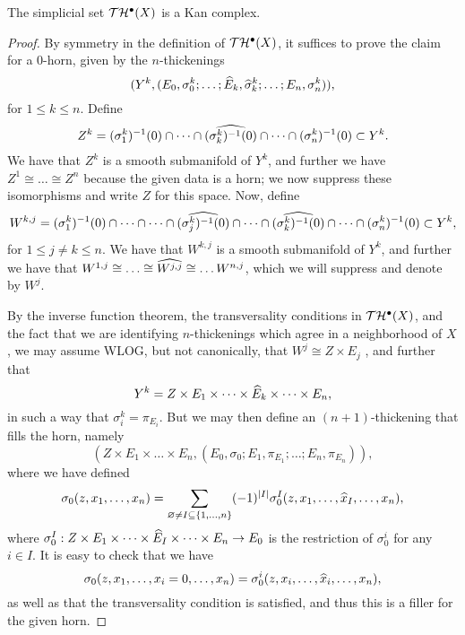 \begin{prop}\label{thickenings-are-kan-complexes}
The simplicial set $\mathcal T \mathcal H^\bullet(X)$ is a Kan complex.
\end{prop}

\begin{proof}
 By symmetry in the definition of $\mathcal T \mathcal H^\bullet(X)$, it suffices to prove the claim for a $0$-horn, given by the $n$-thickenings
\[ (Y^k, (E_0, \sigma_0^k; \dots; \widehat E_k, \widehat \sigma_k^k; \dots; E_n, \sigma_n^k)), \]
for $1 \leq k \leq n$. Define
\[ Z^k = (\sigma_1^k)^{-1}(0) \cap \dots \cap \widehat {(\sigma_k^k)^{-1}(0)} \cap \dots \cap (\sigma_n^k)^{-1}(0) \subset Y^k. \]
We have that $Z^k$ is a smooth submanifold of $Y^k$, and further we have $Z^1 \cong \dots \cong Z^n$ because the given data is a horn; we now suppress these isomorphisms and write $Z$ for this space. Now, define
\[ W^{k, j} = (\sigma_1^k)^{-1}(0) \cap \dots \cap \dots \cap \widehat {(\sigma_j^k)^{-1}(0)} \cap \dots \cap \widehat {(\sigma_k^k)^{-1}(0)} \cap \dots \cap (\sigma_n^k)^{-1}(0) \subset Y^k, \]
for $1 \leq j \neq k \leq n$. We have that $W^{k, j}$ is a smooth submanifold of $Y^k$, and further we have that $W^{1, j} \cong \dots \cong \widehat {W^{j, j}} \cong \dots W^{n, j}$, which we will suppress and denote by $W^j$.

By the inverse function theorem, the transversality conditions in $\mathcal T \mathcal H^\bullet(X)$, and the fact that we are identifying $n$-thickenings which agree in a neighborhood of $X$, we may assume WLOG, but not canonically, that $W^j \cong Z \times E_j$ \jake{[locally on X]}, and further that
\[ Y^k = Z \times E_1 \times \dots \times \widehat E_k \times \dots \times E_n, \]
in such a way that $\sigma_i^k = \pi_{E_i}$. But we may then define an $(n + 1)$-thickening that fills the horn, namely
\[ \left( Z \times E_1 \times \dots \times E_n, \left( E_0, \sigma_0; E_1, \pi_{E_1}; \dots; E_n, \pi_{E_n} \right) \right), \]
where we have defined
\[\sigma_0(z, x_1, \dots, x_n) = \sum_{\varnothing \neq I \subseteq \{1, \dots, n\}} (-1)^{\left\lvert I \right\rvert} \sigma_0^I(z, x_1, \dots, \widehat x_I, \dots, x_n), \]
where $\sigma_0^I: Z \times E_1 \times \dots \times \widehat E_I \times \dots \times E_n \to E_0$ is the restriction of $\sigma_0^i$ for any $i \in I$. It is easy to check that we have
\[ \sigma_0(z, x_1, \dots, x_i = 0, \dots, x_n) = \sigma_0^i(z, x_i, \dots, \widehat x_i, \dots, x_n), \]
as well as that the transversality condition is satisfied, and thus this is a filler for the given horn.
\end{proof}

